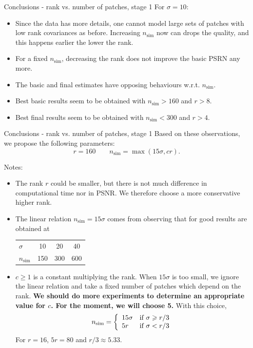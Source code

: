 \documentclass[mathserif, 8pt]{beamer}
\makeatletter
\newcounter{multipleslide}
\newcommand{\restoreframe}{%
\patchcmd{\beamer@@tmpl@footline}%
	{\themultipleslide}%
	{\insertframenumber}%
	{}%
	{}%
\setcounter{framenumber}{\value{multipleslide}}%
}
\makeatother
\begin{document}
\begin{frame}{Conclusions - rank vs. number of patches, stage 1}
	For $\sigma = 10$:
	\begin{itemize}\itemsep=.3cm
		\item Since the data has more details, one cannot model large sets of patches
			with low rank covariances as before. Increasing $n_{\text{sim}}$ now can drops
			the quality, and this happens earlier the lower the rank.
		\item For a fixed $n_{\text{sim}}$, decreasing the rank does not
			improve the basic PSRN any more.
		\item The basic and final estimates have opposing behaviours w.r.t. $n_{\text{sim}}$.
		\item Best basic results seem to be obtained with $n_{\text{sim}} > 
			160$ and $r > 8$.
		\item Best final results seem to be obtained with $n_{\text{sim}}<
			300$ and $r > 4$.
	\end{itemize}
\end{frame}

\begin{frame}{Conclusions - rank vs. number of patches, stage 1}
	Based on these observations, we propose the following parameters:
	\[r = 160\quad\quad n_{\text{sim}} = \max(15\sigma,cr).\]

	Notes:
	\begin{itemize}\itemsep=.3cm
		\item The rank $r$ could be smaller, but there is not much difference in
			computational time nor in PSNR. We therefore choose a more
			conservative higher rank.
		\item The linear relation $n_{\text{sim}} = 15\sigma$ comes from observing that
			for good results are obtained at
			\begin{center}
				\begin{tabular}{l | c c c}
					$\sigma$         &  10 &  20 &  40 \\ 
					$n_{\text{sim}}$ & 150 & 300 & 600 
				\end{tabular}
			\end{center}
		\item $c\geqslant1$ is a constant multiplying the rank. When $15\sigma$
			is too small, we ignore the linear relation and take a fixed number of
			patches which depend on the rank. \textbf{We should do more experiments
			to determine an appropriate value for $c$. For the moment, we will choose
         5.} With this choice,
			\[
				n_{\text{sim}} =
				\left\{
				\begin{array}{l l}
					15\sigma & \text{if }\sigma \geqslant r/3\\
					5r       & \text{if }\sigma < r/3
				\end{array}
				\right.
			\]
			For $r = 16$, $5r = 80$ and $r/3 \approx 5.33$.
	\end{itemize}
\end{frame}
\restoreframe
\end{document}

